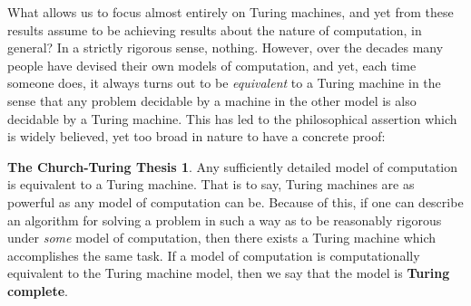 \documentclass{article}
\theoremstyle{definition}
\newtheorem{thesis}{The Church-Turing Thesis}
\theoremstyle{plain}
\theoremstyle{theorem}
\newtheorem{corollary}{Corollary}[section]
\begin{document}
\begin{comment}
 reason has to do with the palindrome problem, PAL.

What does this silly little problem have to do with Universal Turing machines? Well, what we've shown here is that our single string Turing machine is \textit{optimal} - it is the best possible algorithm to solve the problem. Thus, what it tells us isn't so much something about universal Turing machines, so much as something about the difference between multi-tape Turing machines and single-tape Turing machines.
\begin{corollary}
	The class of problems computable by single tape Turing machines in time $O(n)$ is \textit{properly} contained in as the class of problems computable by $k$-tape Turing machines in time $O(n)$. Multi-tape Turing machines offer definite improvements to efficiency, though it is limited to quadratic speedup, and even this is not guaranteed 
\end{corollary}
Thus, suppose there existed a single tape universal Turing machine which could simulate any other Turing machine in time $O(f(n))$, where $f(n)$ is the operating time of the simulated machine. 
\end{comment}
What allows us to focus almost entirely on Turing machines, and yet from these results assume to be achieving results about the nature of computation, in general? In a strictly rigorous sense, nothing. However, over the decades many people have devised their own models of computation, and yet, each time someone does, it always turns out to be \textit{equivalent} to a Turing machine in the sense that any problem decidable by a machine in the other model is also decidable by a Turing machine. This has led to the philosophical assertion which is widely believed, yet too broad in nature to have a concrete proof:
\begin{thesis}
    Any sufficiently detailed model of computation is equivalent to a Turing machine. That is to say, Turing machines are as powerful as any model of computation can be. Because of this, if one can describe an algorithm for solving a problem in such a way as to be reasonably rigorous under \textit{some} model of computation, then there exists a Turing machine which accomplishes the same task. If a model of computation is computationally equivalent to the Turing machine model, then we say that the model is \textbf{Turing complete}.
\end{thesis}
\end{document}
